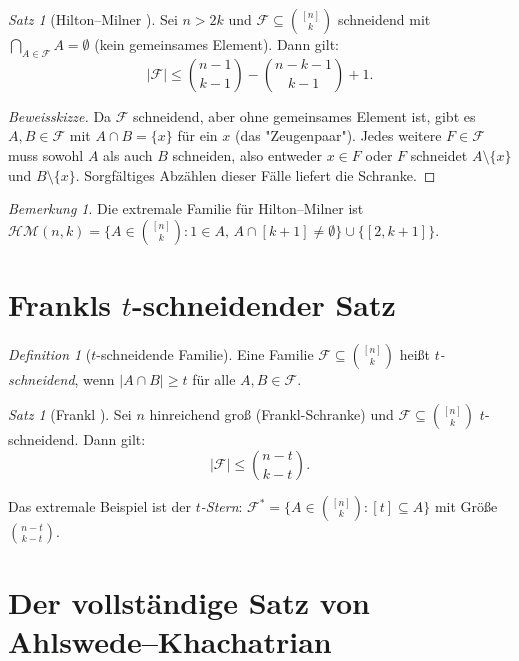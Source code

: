 \documentclass[12pt,a4paper]{amsart}
\theoremstyle{definition}
\theoremstyle{remark}
\newtheorem{satz}[theorem]{Satz}
\newtheorem{bemerkung}[theorem]{Bemerkung}
\newtheorem{definition_de}[theorem]{Definition}
\begin{document}
\begin{satz}[Hilton--Milner \cite{HiltonMilner1967}]\label{satz:hilton_milner}
Sei $n > 2k$ und $\mathcal{F} \subseteq \binom{[n]}{k}$ schneidend mit
$\bigcap_{A \in \mathcal{F}} A = \emptyset$ (kein gemeinsames Element). Dann gilt:
\[
  |\mathcal{F}| \leq \binom{n-1}{k-1} - \binom{n-k-1}{k-1} + 1.
\]
\end{satz}

\begin{proof}[Beweisskizze]
Da $\mathcal{F}$ schneidend, aber ohne gemeinsames Element ist, gibt es
$A, B \in \mathcal{F}$ mit $A \cap B = \{x\}$ für ein $x$ (das "Zeugenpaar").
Jedes weitere $F \in \mathcal{F}$ muss sowohl $A$ als auch $B$ schneiden, also
entweder $x \in F$ oder $F$ schneidet $A \setminus \{x\}$ und $B \setminus \{x\}$.
Sorgfältiges Abzählen dieser Fälle liefert die Schranke.
\end{proof}

\begin{bemerkung}
Die extremale Familie für Hilton--Milner ist
$\mathcal{HM}(n,k) = \{A \in \binom{[n]}{k} : 1 \in A,\, A \cap [k+1] \neq \emptyset\}
\cup \{[2, k+1]\}$.
\end{bemerkung}

\section{Frankls $t$-schneidender Satz}\label{sec:frankl}

\begin{definition_de}[$t$-schneidende Familie]
Eine Familie $\mathcal{F} \subseteq \binom{[n]}{k}$ heißt \emph{$t$-schneidend},
wenn $|A \cap B| \geq t$ für alle $A, B \in \mathcal{F}$.
\end{definition_de}

\begin{satz}[Frankl \cite{Frankl1977}]\label{satz:frankl_t}
Sei $n$ hinreichend groß (Frankl-Schranke) und $\mathcal{F} \subseteq \binom{[n]}{k}$
$t$-schneidend. Dann gilt:
\[
  |\mathcal{F}| \leq \binom{n-t}{k-t}.
\]
\end{satz}

Das extremale Beispiel ist der \emph{$t$-Stern}:
$\mathcal{F}^* = \{A \in \binom{[n]}{k} : [t] \subseteq A\}$ mit Größe
$\binom{n-t}{k-t}$.

\section{Der vollständige Satz von Ahlswede--Khachatrian}\label{sec:ak}
\end{document}
